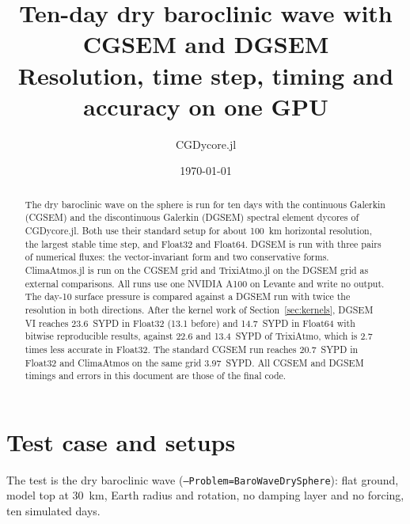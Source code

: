 \documentclass[11pt,a4paper]{article}
\title{Ten-day dry baroclinic wave with CGSEM and DGSEM\\[0.3em]
\large Resolution, time step, timing and accuracy on one GPU}
\author{CGDycore.jl}
\date{\today}
\newcommand{\code}[1]{\texttt{#1}}
\begin{document}
\sloppy
\maketitle

\begin{abstract}
The dry baroclinic wave on the sphere is run for ten days with the
continuous Galerkin (CGSEM) and the discontinuous Galerkin (DGSEM)
spectral element dycores of CGDycore.jl. Both use their standard setup
for about 100~km horizontal resolution, the largest stable time step,
and Float32 and Float64. DGSEM is run with three pairs of numerical
fluxes: the vector-invariant form and two conservative forms. ClimaAtmos.jl
is run on the CGSEM grid and TrixiAtmo.jl on the DGSEM grid as external
comparisons. All runs use one NVIDIA
A100 on Levante and write no output. The day-10 surface pressure is
compared against a DGSEM run with twice the resolution in both
directions. After the kernel work of Section~\ref{sec:kernels}, DGSEM VI
reaches 23.6~SYPD in Float32 (13.1 before) and 14.7~SYPD in Float64
with bitwise reproducible results, against 22.6 and 13.4~SYPD of
TrixiAtmo, which is 2.7 times less accurate in Float32. The standard
CGSEM run reaches 20.7~SYPD in Float32 and ClimaAtmos on the same grid
3.97~SYPD. All CGSEM and DGSEM timings and errors in this document are
those of the final code.
\end{abstract}

\section{Test case and setups}

The test is the dry baroclinic wave (\code{--Problem=BaroWaveDrySphere}):
flat ground, model top at 30~km, Earth radius and rotation, no damping
layer and no forcing, ten simulated days.
\end{document}
